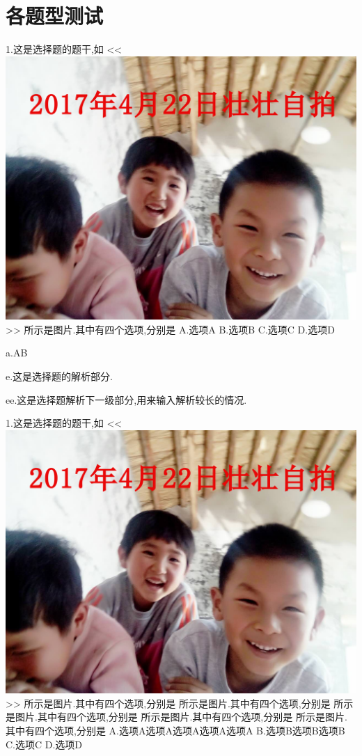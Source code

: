 \documentclass[a4paper,fontset = windowsnew]{ctexart}
\begin{document}


\section{各题型测试}


\begin{choices}
  1.这是选择题的题干,如
  <<
  \includegraphics[scale=0.2]{2.jpg}
  >>
  所示是图片.其中有四个选项,分别是
  A.选项A
  B.选项B
  C.选项C
  D.选项D

  a.AB

  e.这是选择题的解析部分.

  ee.这是选择题解析下一级部分,用来输入解析较长的情况.

  1.这是选择题的题干,如
  <<
  \includegraphics[scale=0.15]{2.jpg}
  >>
  所示是图片.其中有四个选项,分别是
  所示是图片.其中有四个选项,分别是
  所示是图片.其中有四个选项,分别是
  所示是图片.其中有四个选项,分别是
  所示是图片.其中有四个选项,分别是
  A.选项A选项A选项A选项A选项A
  B.选项B选项B选项B
  C.选项C
  D.选项D


\end{choices}
\end{document}
